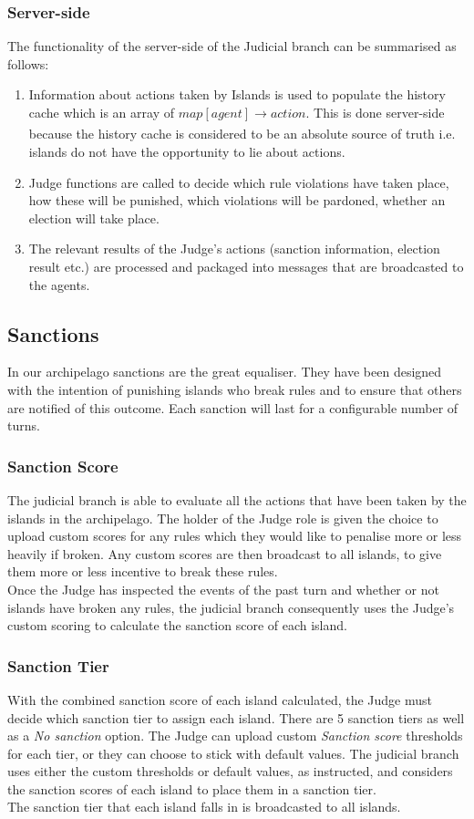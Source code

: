 \subsubsection{Server-side}
The functionality of the server-side of the Judicial branch can be summarised as follows:
\begin{enumerate}
    \item Information about actions taken by Islands is used to populate the history cache which is an array of $map[agent] \xrightarrow[]{} action$. This is done server-side because the history cache is considered to be an absolute source of truth i.e. islands do not have the opportunity to lie about actions.
    \item Judge functions are called to decide which rule violations have taken place, how these will be punished, which violations will be pardoned, whether an election will take place.
    \item The relevant results of the Judge's actions (sanction information, election result etc.) are processed and packaged into messages that are broadcasted to the agents.
\end{enumerate}
\subsection{Sanctions}
In our archipelago sanctions are the great equaliser. They have been designed with the intention of punishing islands who break rules and to ensure that others are notified of this outcome. Each sanction will last for a configurable number of turns.
\subsubsection{Sanction Score}
The judicial branch is able to evaluate all the actions that have been taken by the islands in the archipelago. 
The holder of the Judge role is given the choice to upload custom scores for any rules which they would like to penalise more or less heavily if broken.
Any custom scores are then broadcast to all islands, to give them more or less incentive to break these rules. \\

Once the Judge has inspected the events of the past turn and whether or not islands have broken any rules, the judicial branch consequently uses the Judge's custom scoring to calculate the sanction score of each island.

\subsubsection{Sanction Tier}
With the combined sanction score of each island calculated, the Judge must decide which sanction tier to assign each island. 
There are 5 sanction tiers as well as a \emph{No sanction} option. The Judge can upload custom \emph{Sanction score} thresholds for each tier, or they can choose to stick with default values.
The judicial branch uses either the custom thresholds or default values, as instructed, and considers the sanction scores of each island to place them in a sanction tier. \\
The sanction tier that each island falls in is broadcasted to all islands.

